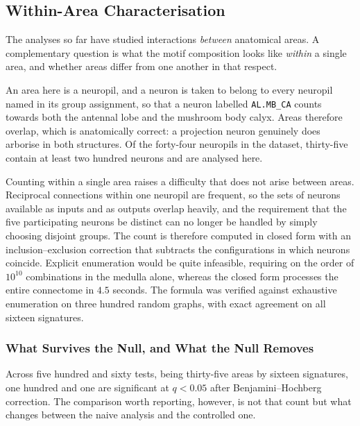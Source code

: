 \documentclass[12pt,a4paper,oneside]{article}
\theoremstyle{definition}
\theoremstyle{plain}
\newcommand{\code}[1]{\texttt{#1}}
\begin{document}
\subsection{Within-Area Characterisation}
\label{sec:results-within}

The analyses so far have studied interactions \emph{between} anatomical
areas. A complementary question is what the motif composition looks like
\emph{within} a single area, and whether areas differ from one another in
that respect.

An area here is a neuropil, and a neuron is taken to belong to every
neuropil named in its group assignment, so that a neuron labelled
\code{AL.MB\_CA} counts towards both the antennal lobe and the mushroom body
calyx. Areas therefore overlap, which is anatomically correct: a projection
neuron genuinely does arborise in both structures. Of the forty-four
neuropils in the dataset, thirty-five contain at least two hundred neurons
and are analysed here.

Counting within a single area raises a difficulty that does not arise
between areas. Reciprocal connections within one neuropil are frequent, so
the sets of neurons available as inputs and as outputs overlap heavily, and
the requirement that the five participating neurons be distinct can no
longer be handled by simply choosing disjoint groups. The count is therefore
computed in closed form with an inclusion--exclusion correction that
subtracts the configurations in which neurons coincide. Explicit enumeration
would be quite infeasible, requiring on the order of $10^{10}$ combinations
in the medulla alone, whereas the closed form processes the entire
connectome in $4.5$ seconds. The formula was verified against exhaustive
enumeration on three hundred random graphs, with exact agreement on all
sixteen signatures.

\subsubsection{What Survives the Null, and What the Null Removes}

Across five hundred and sixty tests, being thirty-five areas by sixteen
signatures, one hundred and one are significant at $q < 0.05$ after
Benjamini--Hochberg correction. The comparison worth reporting, however, is
not that count but what changes between the naive analysis and the
controlled one.
\end{document}

